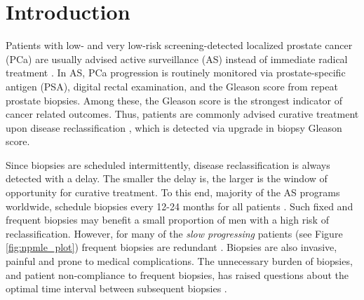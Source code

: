 \section{Introduction}

Patients with low- and very low-risk screening-detected localized prostate cancer (PCa) are usually advised active surveillance (AS) instead of immediate radical treatment \citep{briganti2018active}. In AS, PCa progression is routinely monitored via prostate-specific antigen (PSA), digital rectal examination, and the Gleason score from repeat prostate biopsies. Among these, the Gleason score is the strongest indicator of cancer related outcomes. Thus, patients are commonly advised curative treatment upon disease reclassification \citep{bul2013active}, which is detected via upgrade in biopsy Gleason score.

Since biopsies are scheduled intermittently, disease reclassification is always detected with a delay. The smaller the delay is, the larger is the window of opportunity for curative treatment. To this end, majority of the AS programs worldwide, schedule biopsies every 12-24 months for all patients \citep{nieboer2018active,loeb2014heterogeneity}. Such fixed and frequent biopsies may benefit a small proportion of men with a high risk of reclassification. However, for many of the \textit{slow progressing} patients (see Figure \ref{fig:npmle_plot}) frequent biopsies are redundant . Biopsies are also invasive, painful and prone to medical complications. The unnecessary burden of biopsies, and patient non-compliance \citep{bokhorst2015compliance} to frequent biopsies, has raised questions about the optimal time interval between subsequent biopsies \citep{inoue2018comparative, bratt2013study}.

